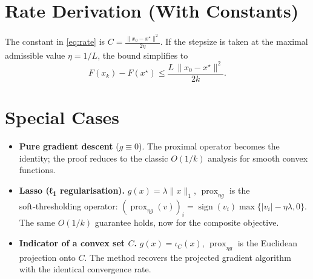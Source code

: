 \documentclass{article}
\newcommand{\prox}{\operatorname{prox}}
\begin{document}
\section*{Rate Derivation (With Constants)}
The constant in \eqref{eq:rate} is $\displaystyle C=\frac{\|x_{0}-x^{\star}\|^{2}}{2\eta}$.
If the stepsize is taken at the maximal admissible value $\eta=1/L$,
the bound simplifies to
\[
F(x_{k})-F(x^{\star})\le \frac{L\,\|x_{0}-x^{\star}\|^{2}}{2k}.
\]

\section*{Special Cases}
\begin{itemize}[nosep]
\item \textbf{Pure gradient descent} ($g\equiv0$).  
  The proximal operator becomes the identity; the proof reduces to the
  classic $O(1/k)$ analysis for smooth convex functions.

\item \textbf{Lasso (ℓ\textsubscript{1} regularisation).}  
  $g(x)=\lambda\|x\|_{1}$, $\prox_{\eta g}$ is the soft‑thresholding
  operator:
  $(\prox_{\eta g}(v))_{i}= \operatorname{sign}(v_{i})
  \max\{|v_{i}|-\eta\lambda,0\}$.
  The same $O(1/k)$ guarantee holds, now for the composite objective.

\item \textbf{Indicator of a convex set $C$.}  
  $g(x)=\iota_{C}(x)$, $\prox_{\eta g}$ is the Euclidean projection
  onto $C$. The method recovers the projected gradient algorithm with the
  identical convergence rate.
\end{itemize}
\end{document}
